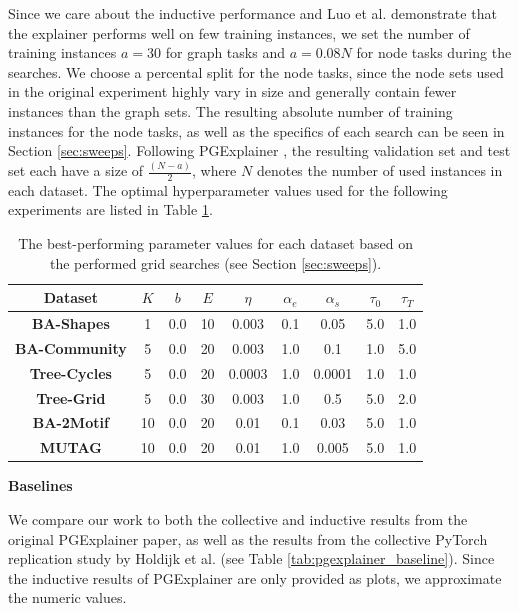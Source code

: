 Since we care about the inductive performance and Luo et al. \cite{luo2020parameterized} demonstrate that the explainer performs well on few training instances, we set the number of training instances $a=30$ for graph tasks and $a=0.08N$ for node tasks during the searches. We choose a percental split for the node tasks, since the node sets used in the original experiment highly vary in size and generally contain fewer instances than the graph sets. The resulting absolute number of training instances for the node tasks, as well as the specifics of each search can be seen in Section \ref{sec:sweeps}. Following PGExplainer \cite{luo2020parameterized}, the resulting validation set and test set each have a size of $\frac{(N-a)}{2}$, where $N$ denotes the number of used instances in each dataset. The optimal hyperparameter values used for the following experiments are listed in Table \ref{tab:best_sweep_values}. \bigskip

\begin{table}[h]
    \centering
    \scriptsize
    \begin{tabular}{|c|c|c|c|c|c|c|c|c|} \hline
    Dataset & $K$ & $b$ & $E$ & $\eta$ & $\alpha_e$ & $\alpha_s$ & $\tau_0$ & $\tau_T$ \\ \hline
    \textbf{BA-Shapes} & 1 & 0.0 & 10 & 0.003 & 0.1 & 0.05 & 5.0 & 1.0 \\ \hline
    \textbf{BA-Community} & 5 & 0.0 & 20 & 0.003 & 1.0 & 0.1 & 1.0 & 5.0 \\ \hline
    \textbf{Tree-Cycles} & 5 & 0.0 & 20 & 0.0003 & 1.0 & 0.0001 & 1.0 & 1.0 \\ \hline
    \textbf{Tree-Grid} & 5 & 0.0 & 30 & 0.003 & 1.0 & 0.5 & 5.0 & 2.0 \\ \hline
    \textbf{BA-2Motif} & 10 & 0.0 & 20 & 0.01 & 0.1 & 0.03 & 5.0 & 1.0 \\ \hline
    \textbf{MUTAG} & 10 & 0.0 & 20 & 0.01 & 1.0 & 0.005 & 5.0 & 1.0 \\ \hline
    \end{tabular}
    \caption[Optimal explainer parameter values for each dataset]{The best-performing parameter values for each dataset based on the performed grid searches (see Section \ref{sec:sweeps}).}
    \label{tab:best_sweep_values}
  \end{table}

\textbf{Baselines}\par
 We compare our work to both the collective and inductive results from the original PGExplainer paper, as well as the results from the collective PyTorch replication study by Holdijk et al. \cite{holdijk2021re} (see Table \ref{tab:pgexplainer_baseline}). Since the inductive results of PGExplainer are only provided as plots, we approximate the numeric values. \bigskip

